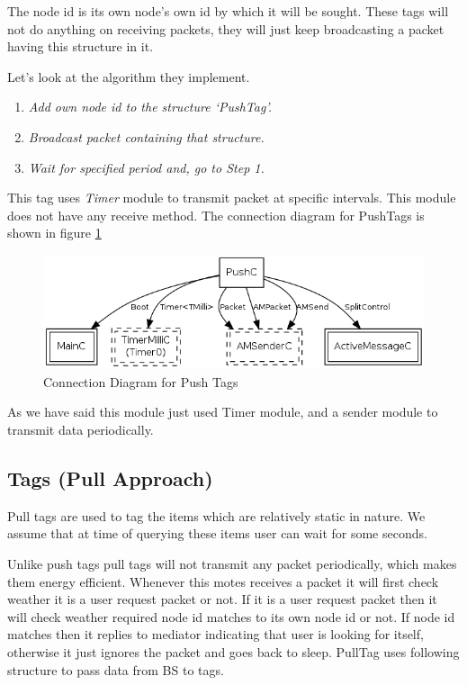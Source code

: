 \documentclass [a4paper,12pt]{book}
\begin{document}
The node id is its own node's own id by which it will be sought. These tags will not do anything on receiving packets, they will just keep broadcasting a packet having this structure in it.

Let's look at the algorithm they implement.
\begin{framed}
\begin{enumerate}
\item \textit{Add own node id to the structure `PushTag'.}
\item \textit{Broadcast packet containing that structure.}
\item \textit{Wait for specified period and, go to Step 1.}
\end{enumerate}
\end{framed}

This tag uses \emph{Timer} module to transmit packet at specific intervals. This module does not have any receive method. The connection diagram for PushTags is shown in figure \ref{push_dia}


\vspace{0.5cm}
\begin{figure}[!h]
\begin{center}
\includegraphics[scale=0.7]{images/20.png}
\caption{Connection Diagram for Push Tags}
\label{push_dia}
\end{center}
\end{figure}

As we have said this module just used Timer module, and a sender module to transmit data periodically.

\subsection{Tags (Pull Approach)}

Pull tags are used to tag the items which are relatively static in nature. We assume that at time of querying these items user can wait for some seconds. 

Unlike push tags pull tags will not transmit any packet periodically, which makes them energy efficient. Whenever this motes receives a packet it will first check weather it is a user request packet or not. If it is a user request packet then it will check weather required node id matches to its own node id or not. If node id matches then it replies to mediator indicating that user is looking for itself, otherwise it just ignores the packet and goes back to sleep. PullTag uses following structure to pass data from BS to tags.
\end{document}
